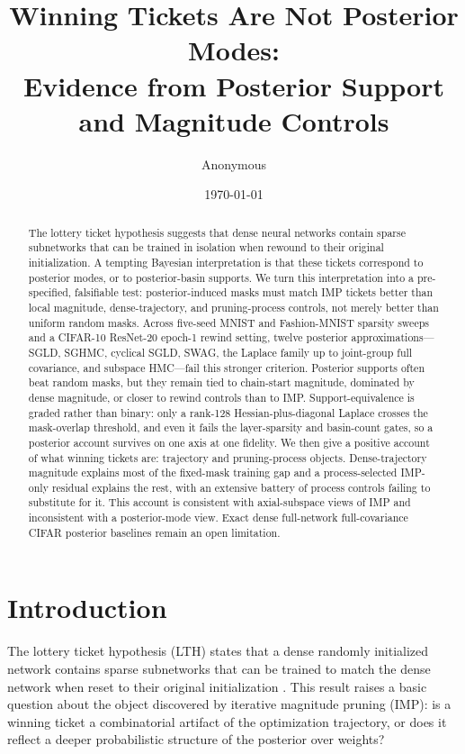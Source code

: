 \documentclass{article}
\title{Winning Tickets Are Not Posterior Modes:\\
Evidence from Posterior Support and Magnitude Controls}
\author{Anonymous}
\date{\today}
\begin{document}
\maketitle

\begin{abstract}
The lottery ticket hypothesis suggests that dense neural networks contain sparse
subnetworks that can be trained in isolation when rewound to their original
initialization. A tempting Bayesian interpretation is that these tickets
correspond to posterior modes, or to posterior-basin supports. We turn this
interpretation into a pre-specified, falsifiable test: posterior-induced masks
must match IMP tickets better than local magnitude, dense-trajectory, and
pruning-process controls, not merely better than uniform random masks. Across
five-seed MNIST and Fashion-MNIST sparsity sweeps and a CIFAR-10 ResNet-20
epoch-1 rewind setting, twelve posterior approximations---SGLD, SGHMC, cyclical
SGLD, SWAG, the Laplace family up to joint-group full covariance, and subspace
HMC---fail this stronger criterion. Posterior supports often beat random masks,
but they remain tied to chain-start magnitude, dominated by dense magnitude, or
closer to rewind controls than to IMP. Support-equivalence is graded rather than
binary: only a rank-128 Hessian-plus-diagonal Laplace crosses the mask-overlap
threshold, and even it fails the layer-sparsity and basin-count gates, so a
posterior account survives on one axis at one fidelity. We then give a positive
account of what winning tickets are: trajectory and pruning-process objects.
Dense-trajectory magnitude explains most of the fixed-mask training gap and a
process-selected IMP-only residual explains the rest, with an extensive battery
of process controls failing to substitute for it. This account is consistent
with axial-subspace views of IMP and inconsistent with a posterior-mode view.
Exact dense full-network full-covariance CIFAR posterior baselines remain an
open limitation.
\end{abstract}

\section{Introduction}

The lottery ticket hypothesis (LTH) states that a dense randomly initialized
network contains sparse subnetworks that can be trained to match the dense
network when reset to their original initialization \citep{frankle2019lottery}.
This result raises a basic question about the object discovered by iterative
magnitude pruning (IMP): is a winning ticket a combinatorial artifact of the
optimization trajectory, or does it reflect a deeper probabilistic structure of
the posterior over weights?
\end{document}
